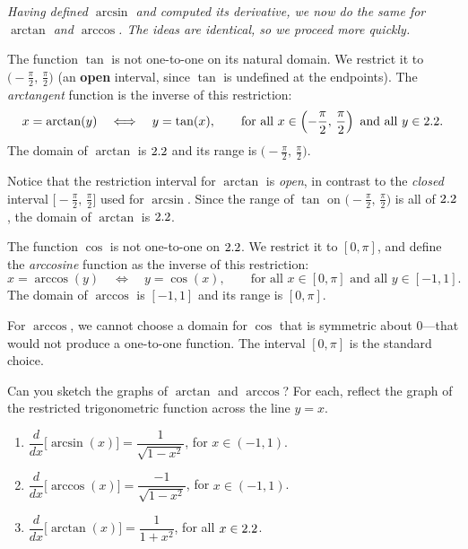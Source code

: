 \textit{Having defined $\arcsin$ and computed its derivative, we now do the same for $\arctan$ and $\arccos$.  The ideas are identical, so we proceed more quickly.}

\begin{definition}[Arctangent]
\label{def:4-9}
The function $\tan$ is not one-to-one on its natural domain.  We restrict it to $\bigl(-\frac{\pi}{2},\, \frac{\pi}{2}\bigr)$ (an \textbf{open} interval, since $\tan$ is undefined at the endpoints).  The \emph{arctangent} function is the inverse of this restriction:
\[
  x = \arctan(y) \quad \Longleftrightarrow \quad y = \tan(x),
  \qquad \text{for all } x \in \left(-\frac{\pi}{2},\, \frac{\pi}{2}\right) \text{ and all } y \in 2.2.
\]
The domain of $\arctan$ is $2.2$ and its range is $\bigl(-\frac{\pi}{2},\, \frac{\pi}{2}\bigr)$.
\end{definition}

\begin{remark}
Notice that the restriction interval for $\arctan$ is \emph{open}, in contrast to the \emph{closed} interval $\bigl[-\frac{\pi}{2},\, \frac{\pi}{2}\bigr]$ used for $\arcsin$.  Since the range of $\tan$ on $\bigl(-\frac{\pi}{2},\, \frac{\pi}{2}\bigr)$ is all of $2.2$, the domain of $\arctan$ is $2.2$.
\end{remark}

\begin{definition}[Arccosine]
\label{def:4-10}
The function $\cos$ is not one-to-one on $2.2$.  We restrict it to $[0,\pi]$, and define the \emph{arccosine} function as the inverse of this restriction:
\[
  x = \arccos(y) \quad \Longleftrightarrow \quad y = \cos(x),
  \qquad \text{for all } x \in [0,\pi] \text{ and all } y \in [-1,1].
\]
The domain of $\arccos$ is $[-1,1]$ and its range is $[0,\pi]$.
\end{definition}

\begin{remark}
For $\arccos$, we cannot choose a domain for $\cos$ that is symmetric about $0$---that would not produce a one-to-one function.  The interval $[0,\pi]$ is the standard choice.
\end{remark}

\begin{remark}
Can you sketch the graphs of $\arctan$ and $\arccos$?  For each, reflect the graph of the restricted trigonometric function across the line $y = x$.
\end{remark}

\begin{theorem}
\label{thm:4-9}
\begin{enumerate}[label=(\roman*)]
  \item $\dfrac{d}{dx}\bigl[\arcsin(x)\bigr] = \dfrac{1}{\sqrt{1 - x^{2}}}$, \qquad for $x \in (-1,1)$.
  \item $\dfrac{d}{dx}\bigl[\arccos(x)\bigr] = \dfrac{-1}{\sqrt{1 - x^{2}}}$, \qquad for $x \in (-1,1)$.
  \item $\dfrac{d}{dx}\bigl[\arctan(x)\bigr] = \dfrac{1}{1 + x^{2}}$, \qquad for all $x \in 2.2$.
\end{enumerate}
\end{theorem}

